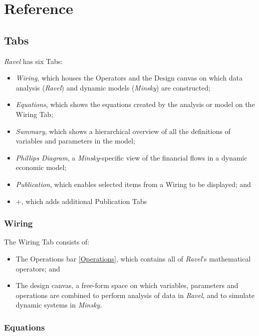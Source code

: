 \newcommand\operatorKey[1]{
  \begin{center}
    \texttt{[image: images/\#1]}
  \end{center}
  }

\chapter{Reference}

\section{Tabs}

\emph{Ravel} has six Tabs:
\begin{itemize}
\item \emph{Wiring}, which houses the Operators and the Design canvas on
which data analysis (\emph{Ravel}) and dynamic models (\emph{Minsky})
are constructed;
\item \emph{Equations}, which shows the equations created by the analysis
or model on the Wiring Tab;
\item \emph{Summary}, which shows a hierarchical overview of all the definitions
of variables and parameters in the model;
\item \emph{Phillips Diagram}, a \emph{Minsky}-specific view of the financial
flows in a dynamic economic model;
\item \emph{Publication}, which enables selected items from a Wiring to
be displayed; and
\item +, which adds additional Publication Tabs
\end{itemize}

\subsection{Wiring}

The Wiring Tab consists of:
\begin{itemize}
\item The Operations bar \ref{Operations}, which contains all of \emph{Ravel}'s
mathematical operators; and
\item The design canvas, a free-form space on which variables, parameters
and operations are combined to perform analysis of data in \emph{Ravel},
and to simulate dynamic systems in \emph{Minsky}.
\end{itemize}

\subsection{Equations}

